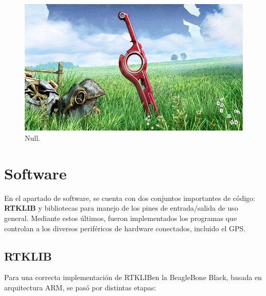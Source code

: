 \begin{figure}[ht]
\centering
\includegraphics[scale=0.12]{Figures/null}
\caption[null.]{Null.\footnotemark}
\label{fig:null4}
\end{figure}

\section{Software}

En el apartado de software, se cuenta con dos conjuntos importantes de código: \textbf{RTKLIB} y bibliotecas para manejo de los pines de entrada/salida de uso general. Mediante estos últimos, fueron implementados los programas que controlan a los diversos periféricos de hardware conectados, incluido el GPS.

\subsection{RTKLIB}

Para una correcta implementación de RTKLIB\footnotemark en la BeagleBone Black, basada en arquitectura ARM, se pasó por distintas etapas:


